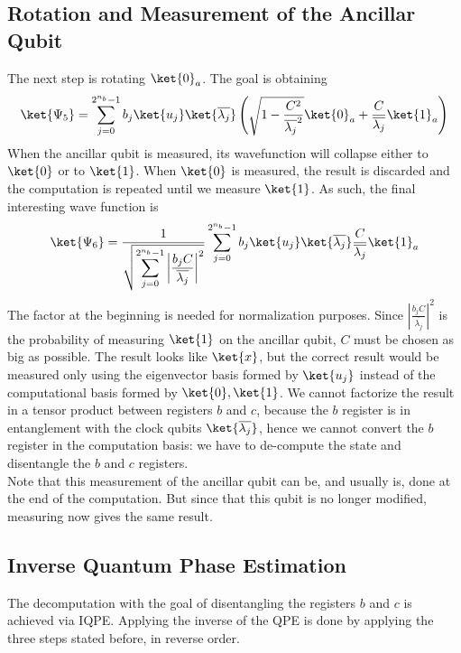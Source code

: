 \documentclass[10pt]{article}
\begin{document}
\subsection{Rotation and Measurement of the Ancillar Qubit}
The next step is rotating $\ket{0}_a$. The goal is obtaining
$$\ket{\Psi_5}=\sum_{j=0}^{2^{n_b}-1}b_j\ket{u_j}\ket{\overline{\lambda_j}}\left(\sqrt{1-\frac{C^2}{\overline{\lambda_j}^2}}\ket{0}_a+\frac{C}{\overline{\lambda_j}}\ket{1}_a\right)$$
When the ancillar qubit is measured, its wavefunction will collapse either to $\ket{0}$ or to $\ket{1}$. When $\ket{0}$ is measured, the result is discarded and the computation is repeated until we measure $\ket{1}$. As such, the final interesting wave function is
$$\ket{\Psi_6}=\frac{\displaystyle 1}{\displaystyle \sqrt{\sum_{j=0}^{2^{n_b}-1}\left|\frac{b_jC}{\overline{\lambda_j}}\right|^2}}\sum_{j=0}^{2^{n_b}-1}b_j\ket{u_j}\ket{\overline{\lambda_j}}\frac{C}{\overline{\lambda_j}}\ket{1}_a$$
The factor at the beginning is needed for normalization purposes. Since $|\frac{b_jC}{\overline{\lambda_j}}|^2$ is the probability of measuring $\ket{1}$ on the ancillar qubit, $C$ must be chosen as big as possible. The result looks like $\ket{x}$, but the correct result would be measured only using the eigenvector basis formed by $\ket{u_j}$ instead of the computational basis formed by $\ket{0},\ket{1}$. We cannot factorize the result in a tensor product between registers $b$ and $c$, because the $b$ register is in entanglement with the clock qubits $\ket{\overline{\lambda_j}}$, hence we cannot convert the $b$ register in the computation basis: we have to de-compute the state and disentangle the $b$ and $c$ registers.\\
Note that this measurement of the ancillar qubit can be, and usually is, done at the end of the computation. But since that this qubit is no longer modified, measuring now gives the same result.
\subsection{Inverse Quantum Phase Estimation}
The decomputation with the goal of disentangling the registers $b$ and $c$ is achieved via IQPE. Applying the inverse of the QPE is done by applying the three steps stated before, in reverse order.
\end{document}
